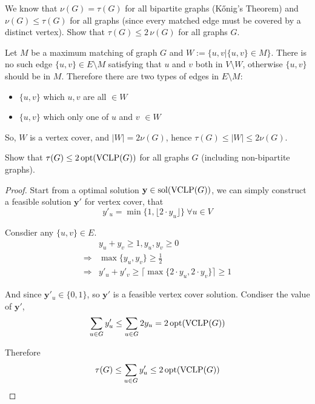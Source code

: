 \documentclass[11pt,a4paper,oneside]{article}
\newcommand{\y}{\mathbf{y}}
\newcommand{\sol}{\textup{\textrm{sol}}}
\newcommand{\opt}{\textup{\textrm{opt}}}
\begin{document}
\begin{problem}{2}
  \statement
 We know that $\nu(G) = \tau(G)$ for all bipartite graphs (K\H{o}nig's Theorem) and
 $\nu(G) \leq \tau(G)$ for all graphs (since every matched edge must be covered
 by a distinct vertex). Show that $\tau(G) \leq 2 \, \nu(G)$ for all graphs $G$.   
  
  \solution
  
  Let \(M\) be a maximum matching of graph \(G\) and \(W := \{u, v | \{u, v\} \in M\}\). There is no such edge \(\{u, v\} \in E \setminus M\) satisfying that \(u\) and \(v\) both in \(V \setminus W\), otherwise \(\{u, v\}\) should be in \(M\). Therefore there are two types of edges in \(E \setminus M\):
  
  \begin{itemize}
  	\item \(\{u, v\}\) which \(u, v\) are all \(\in W\)
  	\item \(\{u, v\}\) which only one of \(u\) and \(v\) \(\in W\)
  \end{itemize}

	So, \(W\) is a vertex cover, and \(|W| = 2\nu(G)\), hence \(\tau(G) \leq |W| \leq 2\nu(G)\).
\end{problem}


\begin{problem}{3}
	\statement
     Show that $\tau(G) \leq 2\, \opt(\textrm{VCLP}(G))$ for all graphs $G$ (including non-bipartite graphs).
  
    \solution
    \begin{proof}
      Start from a optimal solution $\y \in \sol(\textrm{VCLP}(G))$, we can simply construct a feasible solution $\y'$ for vertex cover, that 
      $$ y'_u = \min\{1,\lfloor 2 \cdot y_u \rfloor\} ~ \forall u \in V$$
      
      Consdier any $\{u, v\} \in E$.
      \begin{align*}
        &y_u + y_v \geq 1, y_u, y_v \geq 0 \\
      \Rightarrow& \max \{y_u, y_v\} \geq \frac 12 \\
      \Rightarrow& y'_u + y'_v \geq \lceil \max \{2\cdot y_u, 2\cdot y_v\} \rceil \geq 1\end{align*}
      
      And since $\y'_u \in \{0, 1\}$, so $\y'$ is a feasible vertex cover solution. Condiser the value of $\y'$,
      $$ \sum_{u \in G}y'_u \leq \sum_{u \in G} 2y_u = 2\, \opt(\textrm{VCLP}(G))$$
      
      Therefore $$\tau(G) \leq \sum_{u \in G}y'_u \leq  2\, \opt(\textrm{VCLP}(G))$$
    
    \end{proof}
    
\end{problem}
\end{document}
